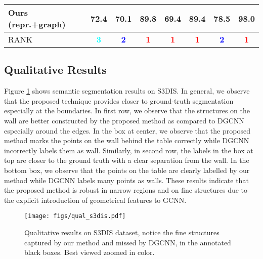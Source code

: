 \begin{table}[!t]
{\begin{tabular}{ l|c c c c c c c }
\hline
Ours (repr.+graph)  & 72.4 & 70.1 & \textbf{89.8} & \textbf{69.4} & \textbf{89.4} & 78.5 & \textbf{98.0}\\
\hline
RANK & \textbf{\textcolor{cyan}{3}} & \textbf{\textcolor{blue}{2}} & \textbf{\textcolor{red}{1}} & \textbf{\textcolor{red}{1}} & \textbf{\textcolor{red}{1}} & \textbf{\textcolor{blue}{2}} & \textbf{\textcolor{red}{1}}\\
\hline
\end{tabular}
}
\vspace{-2ex}

\end{table}

\vspace{-1ex}
\subsection{Qualitative Results}
Figure \ref{figQuals3dis} shows semantic segmentation results on S3DIS. In general, we observe that
the proposed technique provides closer to ground-truth segmentation especially at the boundaries. In
first row, we observe that the structures on the wall are better constructed by the proposed method 
as compared to DGCNN especially around the edges. In the box at center, we observe that the proposed
method marks the points on the wall behind the table correctly while DGCNN incorrectly
labels them as wall. Similarly, in second row, the labels in the box at top are closer to the ground
truth with a clear separation from the wall. In the bottom box, we observe that the points
on the table are clearly labelled by our method while DGCNN labels many points as walls. These
results indicate that the proposed method is robust in narrow regions and on fine structures due to
the explicit introduction of geometrical features to GCNN. 

\begin{figure}[t]
\texttt{[image: figs/qual\_s3dis.pdf]}
\vskip -0.1in
\caption{Qualitative results on S3DIS dataset, notice the fine structures captured by our method and
missed by DGCNN, in the annotated black boxes. Best viewed zoomed in color.}
\label{figQuals3dis}
\vskip -0.2in
\end{figure}

